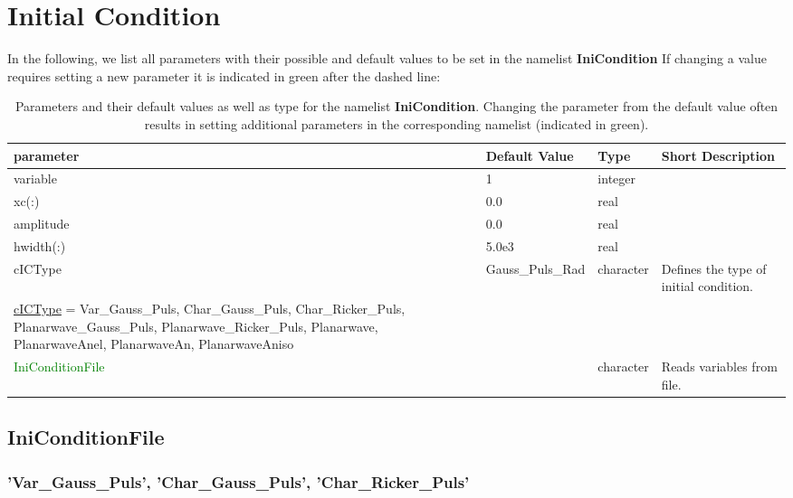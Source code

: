 \documentclass[12pt,twoside]{article}
\begin{document}
\newpage

\section{Initial Condition}
\label{sec-block-ic}

In the following, we list all parameters with their possible and default values to be set in the namelist  \textbf{IniCondition}
If changing a value requires setting a new 
parameter it is indicated in green after the dashed line:\\

\begin{table}[H]
\caption{Parameters and their default values as well as type for the namelist \textbf{IniCondition}.
         Changing the parameter from the default value often results in setting additional parameters in the corresponding namelist (indicated in green).}
\begin{center}
\begin{tabular}{|p{4cm}|p{2.6cm}|p{2cm}|p{5cm}|}
\hline
parameter & Default Value & Type & Short Description \\
\hline
\hline
variable & 1 & integer & \\
xc(:) & 0.0 & real &\\
amplitude & 0.0 & real &\\
hwidth(:) & 5.0e3 & real &\\
\hline
cICType & Gauss\_Puls\_Rad & character & Defines the type of initial condition.\\
\hdashline
\uline{cICType} = Var\_Gauss\_Puls, Char\_Gauss\_Puls, Char\_Ricker\_Puls, Planarwave\_Gauss\_Puls, Planarwave\_Ricker\_Puls, Planarwave, PlanarwaveAnel,
PlanarwaveAn, PlanarwaveAniso & & &\\
\textcolor{green}{IniConditionFile} & & character & Reads variables from file.\\
\hline
\end{tabular}
\end{center}
\label{ini-table}
\end{table}

\newpage

\subsection{IniConditionFile}

\subsubsection{'Var\_Gauss\_Puls', 'Char\_Gauss\_Puls', 'Char\_Ricker\_Puls'}
\end{document}
